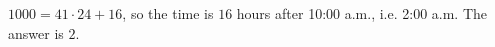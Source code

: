 $1000=41\cdot24+16$, so the time is $16$ hours after 10:00 a.m., i.e. 2:00 a.m. The answer is $\boxed{2}$.
